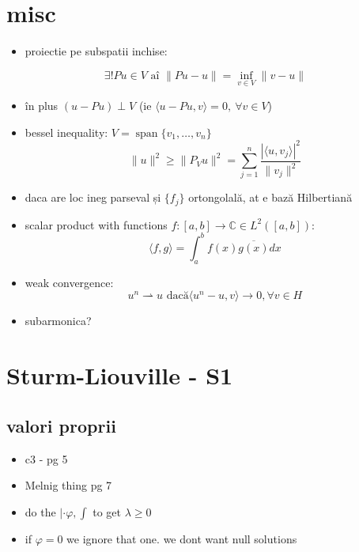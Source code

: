 \documentclass[11pt]{article}
\begin{document}
\section*{misc}
\label{sec:orga9ef1c7}
\begin{itemize}
\item proiectie pe subspatii inchise:
\end{itemize}
\[ \exists ! Pu \in V  \text{ aî } \| P u - u \|  = \inf_{v \in V} \| v - u \| \]
\begin{itemize}
\item în plus \((u-Pu)\perp V\) (ie \(\langle u-Pu, v \rangle = 0,~ \forall v \in V\))
\end{itemize}
\begin{itemize}
\item bessel inequality: \(V = \operatorname{span} \{ v_1,\ldots, v_n \}\)
\[ \| u\|^2 \geq \|P_V u\|^2 = \sum_{j=1}^n \frac{|\langle u, v_j\rangle|^2}{\|v_j\|^2} \]
\item daca are loc ineg parseval și \(\{f_j\}\) ortongolală, at e bază Hilbertiană
\item scalar product with functions \(f: [a,b] \to \mathbb{C} \in L^2([a, b])\):
\[ \langle f, g\rangle = \int_a^b f(x) \overline{g(x)} dx  \]
\item weak convergence:
\[ u^n \rightharpoonup u \text{ dacă} \langle u^n-u, v\rangle \to 0, \forall v \in H \]
\item subarmonica?
\end{itemize}


\section*{Sturm-Liouville - S1}
\label{sec:org5c22f53}
\subsection*{valori proprii}
\label{sec:org9ed58b0}
\begin{itemize}
\item c3 - pg 5
\item Melnig thing pg 7

\item do the \(|\cdot \varphi, \int\) to get \(\lambda \geq 0\)
\item if \(\varphi = 0\) we ignore that one. we dont want null solutions
\end{itemize}
\end{document}
